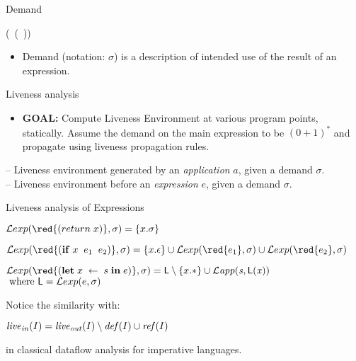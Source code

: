 \documentclass[xcolor=x11names,compress,mathserif]{beamer}
\renewcommand{\(}{\begin{columns}}
\renewcommand{\)}{\end{columns}}
\newcommand{\<}[1]{\begin{column}{#1}}
\renewcommand{\>}{\end{column}}
\begin{document}
\begin{frame}{Demand}
  \begin{center}
     (\CAR\ (\CDR\ \pw)) \\
  \end{center}
  \pause
\centerline{}
  \begin{itemize}
  \item Demand  (notation: $\sigma$) is a description  of intended use
    of the result of an expression.
  \end{itemize}
\end{frame}

\begin{frame}{Liveness analysis}
  \begin{itemize}
  \item {\bf  GOAL:} Compute  Liveness Environment at  various program
    points, statically. Assume the demand on the main expression to be $(0+1)^*$ and propagate using liveness propagation rules.
  \end{itemize}
  \bigskip\pause
    --  Liveness  environment  generated  by  an  {\em
    application} $a$, given a demand $\sigma$.\\
  \bigskip
   -- Liveness environment  before an {\em expression}
  $e$, given a demand $\sigma$.

\end{frame}

\begin{frame}{Liveness analysis of Expressions}

\normalsize
$\Lexp{{\red{(return\; x)}}}{\sigma} = \{x.\sigma\}$


\bigskip
\medskip

  $\Lexp{{\red{(\SIF \; x\;\;  e_1\; \; e_2)}}}{\sigma} = \{x.\epsilon\} 
 \cup \Lexp{{\red{ e_1}}}{\sigma} \cup \Lexp{{\red{e_2}}}{\sigma}$



\bigskip
\medskip

$  \Lexp{{\red{(\LET \; x\; \leftarrow \; s \; \IN \; e)}}}{\sigma} = \Lv
           \setminus \{x.*\}
           \cup \mathit{\Lapp{s}{\Lv(x)}}$\\
\hspace*{4.5cm} $ \mbox{ where } \mathsf{L} = \mathcal{L}exp(e,\sigma)$

\bigskip

\pause
Notice the similarity with:
\bigskip

\centerline{$\mathit{live}_\mathit{in}(I)      =     \mathit{live}_\mathit{out}(I)
\setminus \mathit{def\/}(I) \cup \mathit{ref\/}(I)$}
\bigskip

in classical dataflow analysis for imperative languages.
\end{frame}
\end{document}
